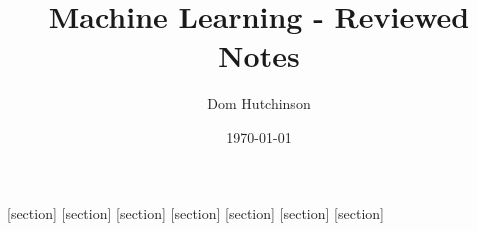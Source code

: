 \documentclass[11pt,a4paper]{article}
\begin{document}
\pagestyle{fancy}
\setlength\parindent{0pt}
\allowdisplaybreaks

\renewcommand{\headrulewidth}{0pt}


\title{Machine Learning - Reviewed Notes}
\author{Dom Hutchinson}
\date{\today}
\maketitle

\fancyhead[R]{\today}


[section]
[section]
[section]
[section]
[section]
[section]
[section]

\newcommand{\dotprod}[0]{\boldsymbol{\cdot}}
\newcommand{\cosech}[0]{\mathrm{cosech}\ }
\newcommand{\cosec}[0]{\mathrm{cosec}\ }
\newcommand{\sech}[0]{\mathrm{sech}\ }
\newcommand{\prob}[0]{\mathbb{P}}
\newcommand{\nats}[0]{\mathbb{N}}
\newcommand{\cov}[0]{\mathrm{Cov}}
\newcommand{\var}[0]{\mathrm{Var}}
\newcommand{\expect}[0]{\mathbb{E}}
\newcommand{\reals}[0]{\mathbb{R}}
\newcommand{\integers}[0]{\mathbb{Z}}
\newcommand{\indicator}[0]{\mathds{1}}
\newcommand{\nb}[0]{\textit{N.B.} }
\newcommand{\ie}[0]{\textit{i.e.} }
\newcommand{\eg}[0]{\textit{e.g.} }
\newcommand{\X}[0]{\textbf{X}}
\newcommand{\x}[0]{\textbf{x}}
\newcommand{\iid}[0]{\overset{\text{iid}}{\sim}}
\newcommand{\proved}[0]{$\hfill\square$\\}
\end{document}
